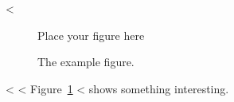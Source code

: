 <%

\begin{figure}
  \centering
  Place your figure here
  \caption{The example figure.}
  \label{fig:label}
\end{figure}

<%
 <%
Figure~\ref{fig:label}
<%
shows something interesting.
